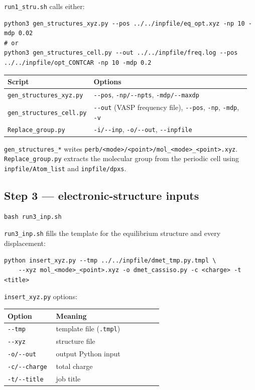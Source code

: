 \documentclass[11pt,a4paper]{article}
\begin{document}
\texttt{run1\_stru.sh} calls either:

\begin{lstlisting}
python3 gen_structures_xyz.py --pos ../../inpfile/eq_opt.xyz -np 10 -mdp 0.02
# or
python3 gen_structures_cell.py --out ../../inpfile/freq.log --pos ../../inpfile/opt_CONTCAR -np 10 -mdp 0.2
\end{lstlisting}

\begin{longtable}[]{@{}>{\raggedright\arraybackslash}p{0.30\linewidth} >{\raggedright\arraybackslash}p{0.66\linewidth}@{}}
\toprule
Script & Options\tabularnewline
\midrule
\endhead
\texttt{gen\_structures\_xyz.py} & \texttt{-\/-pos},
\texttt{-np/-\/-npts}, \texttt{-mdp/-\/-maxdp}\tabularnewline
\texttt{gen\_structures\_cell.py} & \texttt{-\/-out} (VASP frequency
file), \texttt{-\/-pos}, \texttt{-np}, \texttt{-mdp},
\texttt{-v}\tabularnewline
\texttt{Replace\_group.py} & \texttt{-i/-\/-inp}, \texttt{-o/-\/-out},
\texttt{-\/-inpfile}\tabularnewline
\bottomrule
\end{longtable}

\texttt{gen\_structures\_*} writes
\texttt{perb/\textless{}mode\textgreater{}/\textless{}point\textgreater{}/mol\_\textless{}mode\textgreater{}\_\textless{}point\textgreater{}.xyz}.
\texttt{Replace\_group.py} extracts the molecular group from the
periodic cell using \texttt{inpfile/Atom\_list} and
\texttt{inpfile/dpxs}.

\subsection{Step 3 --- electronic-structure
inputs}\label{step-3-electronic-structure-inputs}

\begin{lstlisting}
bash run3_inp.sh
\end{lstlisting}

\texttt{run3\_inp.sh} fills the template for the equilibrium structure
and every displacement:

\begin{lstlisting}
python insert_xyz.py --tmp ../../inpfile/dmet_tmp.py.tmpl \
    --xyz mol_<mode>_<point>.xyz -o dmet_cassiso.py -c <charge> -t <title>
\end{lstlisting}

\texttt{insert\_xyz.py} options:

\begin{longtable}[]{@{}>{\raggedright\arraybackslash}p{0.30\linewidth} >{\raggedright\arraybackslash}p{0.66\linewidth}@{}}
\toprule
Option & Meaning\tabularnewline
\midrule
\endhead
\texttt{-\/-tmp} & template file (\texttt{.tmpl})\tabularnewline
\texttt{-\/-xyz} & structure file\tabularnewline
\texttt{-o/-\/-out} & output Python input\tabularnewline
\texttt{-c/-\/-charge} & total charge\tabularnewline
\texttt{-t/-\/-title} & job title\tabularnewline
\bottomrule
\end{longtable}
\end{document}
